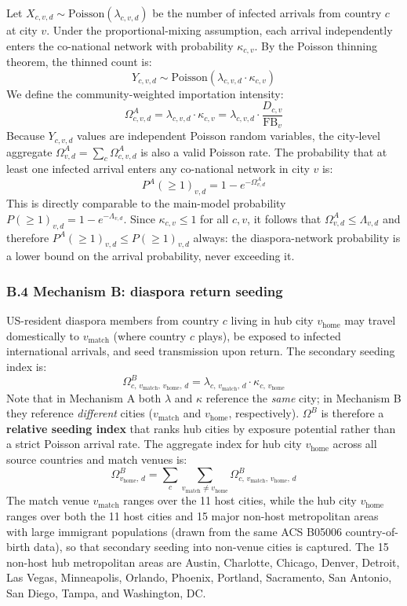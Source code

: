 \documentclass[12pt, a4paper]{article}
\begin{document}
Let $X_{c,v,d} \sim \text{Poisson}(\lambda_{c,v,d})$ be the number
of infected arrivals from country $c$ at city $v$. Under the
proportional-mixing assumption, each arrival independently enters
the co-national network with probability $\kappa_{c,v}$. By the
Poisson thinning theorem, the thinned count is:
\[
  Y_{c,v,d} \sim \text{Poisson}(\lambda_{c,v,d} \cdot \kappa_{c,v})
\]
We define the community-weighted importation intensity:
\[
  \Omega^A_{c,v,d} = \lambda_{c,v,d} \cdot \kappa_{c,v}
    = \lambda_{c,v,d} \cdot \frac{D_{c,v}}{\mathrm{FB}_{v}}
\]
Because $Y_{c,v,d}$ values are independent Poisson random variables,
the city-level aggregate $\Omega^A_{v,d} = \sum_c \Omega^A_{c,v,d}$
is also a valid Poisson rate. The probability that at least one
infected arrival enters any co-national network in city $v$ is:
\[
  P^A(\geq 1)_{v,d} = 1 - e^{-\Omega^A_{v,d}}
\]
This is directly comparable to the main-model probability
$P(\geq 1)_{v,d} = 1 - e^{-\Lambda_{v,d}}$. Since
$\kappa_{c,v} \leq 1$ for all $c,v$, it follows that
$\Omega^A_{v,d} \leq \Lambda_{v,d}$ and therefore
$P^A(\geq 1)_{v,d} \leq P(\geq 1)_{v,d}$ always: the
diaspora-network probability is a lower bound on the arrival
probability, never exceeding it.

\subsubsection*{B.4 Mechanism B: diaspora return seeding}

US-resident diaspora members from country $c$ living in hub city
$v_{\text{home}}$ may travel domestically to $v_{\text{match}}$
(where country $c$ plays), be exposed to infected international
arrivals, and seed transmission upon return. The secondary seeding
index is:
\[
  \Omega^B_{c,\,v_{\text{match}},\,v_{\text{home}},\,d}
    = \lambda_{c,\,v_{\text{match}},\,d}
      \cdot \kappa_{c,\,v_{\text{home}}}
\]
Note that in Mechanism A both $\lambda$ and $\kappa$ reference the
\emph{same} city; in Mechanism B they reference \emph{different}
cities ($v_{\text{match}}$ and $v_{\text{home}}$, respectively).
$\Omega^B$ is therefore a \textbf{relative seeding index} that
ranks hub cities by exposure potential rather than a strict Poisson
arrival rate. The aggregate index for hub city $v_{\text{home}}$
across all source countries and match venues is:
\[
  \Omega^B_{v_{\text{home}},\,d}
    = \sum_c \sum_{v_{\text{match}} \neq v_{\text{home}}}
      \Omega^B_{c,\,v_{\text{match}},\,v_{\text{home}},\,d}
\]
The match venue $v_{\text{match}}$ ranges over the 11 host cities,
while the hub city $v_{\text{home}}$ ranges over both the 11 host
cities and 15 major non-host metropolitan areas with large immigrant
populations (drawn from the same ACS B05006 country-of-birth data),
so that secondary seeding into non-venue cities is captured. The 15
non-host hub metropolitan areas are Austin, Charlotte, Chicago,
Denver, Detroit, Las Vegas, Minneapolis, Orlando, Phoenix, Portland,
Sacramento, San Antonio, San Diego, Tampa, and Washington, DC.
\end{document}
